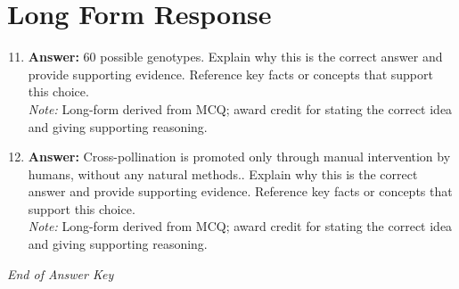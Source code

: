\documentclass[12pt]{article}
\begin{document}
\section*{Long Form Response}
\begin{enumerate}[label=\arabic*.]
\setcounter{enumi}{10}
\item \textbf{Answer:} 60 possible genotypes. Explain why this is the correct answer and provide supporting evidence. Reference key facts or concepts that support this choice.
\\ \textit{Note:} Long-form derived from MCQ; award credit for stating the correct idea and giving supporting reasoning.
\item \textbf{Answer:} Cross-pollination is promoted only through manual intervention by humans, without any natural methods.. Explain why this is the correct answer and provide supporting evidence. Reference key facts or concepts that support this choice.
\\ \textit{Note:} Long-form derived from MCQ; award credit for stating the correct idea and giving supporting reasoning.
\end{enumerate}

\vfill
\noindent\textit{End of Answer Key}
\end{document}
